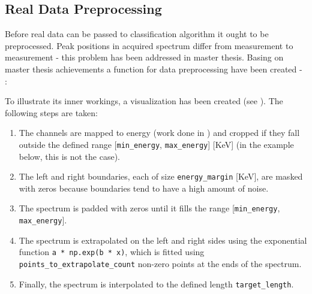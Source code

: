 \subsection{Real Data Preprocessing}
Before real data can be passed to classification algorithm it ought to be preprocessed. 
Peak positions in acquired spectrum differ from measurement to measurement - this problem has been addressed in \cite{Goral2023} master thesis.
Basing on master thesis achievements a function for data preprocessing have been created - :

\newenvironment{longlistingF}{\captionsetup{type=listing, width=0.8\textwidth}}{}
\begin{longlistingF}
    \caption{}
    \label{lst:data_preprocessing}
\end{longlistingF}
\vspace{12pt}

To illustrate its inner workings, a visualization has been created (see ). The following steps are taken:
\begin{enumerate}
    \item The channels are mapped to energy (work done in \cite{Goral2023}) and cropped if they fall outside the defined range [\texttt{min\_energy}, \texttt{max\_energy}] [KeV] (in the example below, this is not the case).
    \item The left and right boundaries, each of size \texttt{energy\_margin} [KeV], are masked with zeros because boundaries tend to have a high amount of noise.
    \item The spectrum is padded with zeros until it fills the range [\texttt{min\_energy}, \texttt{max\_energy}].
    \item The spectrum is extrapolated on the left and right sides using the exponential function \texttt{a * np.exp(b * x)}, which is fitted using \texttt{points\_to\_extrapolate\_count} non-zero points at the ends of the spectrum.
    \item Finally, the spectrum is interpolated to the defined length \texttt{target\_length}.
\end{enumerate}

